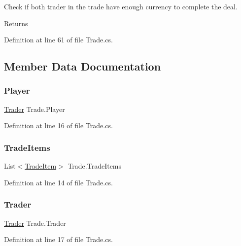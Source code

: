 Check if both trader in the trade have enough currency to complete the deal. 

\begin{DoxyReturn}{Returns}

\end{DoxyReturn}


Definition at line 61 of file Trade.\+cs.



\subsection{Member Data Documentation}
\mbox{\label{class_trade_aa0a7026f96034e12f9e5f091fecc0f7a}} 
\subsubsection{\texorpdfstring{Player}{Player}}
{\footnotesize\ttfamily \hyperlink{class_trader}{Trader} Trade.\+Player}



Definition at line 16 of file Trade.\+cs.

\mbox{\label{class_trade_acc717b21584feecc94ecec3193063978}} 
\subsubsection{\texorpdfstring{Trade\+Items}{TradeItems}}
{\footnotesize\ttfamily List$<$\hyperlink{class_trade_item}{Trade\+Item}$>$ Trade.\+Trade\+Items}



Definition at line 14 of file Trade.\+cs.

\mbox{\label{class_trade_af15be18bc46b24eb2e8dd2b434f324ad}} 
\subsubsection{\texorpdfstring{Trader}{Trader}}
{\footnotesize\ttfamily \hyperlink{class_trader}{Trader} Trade.\+Trader}



Definition at line 17 of file Trade.\+cs.



